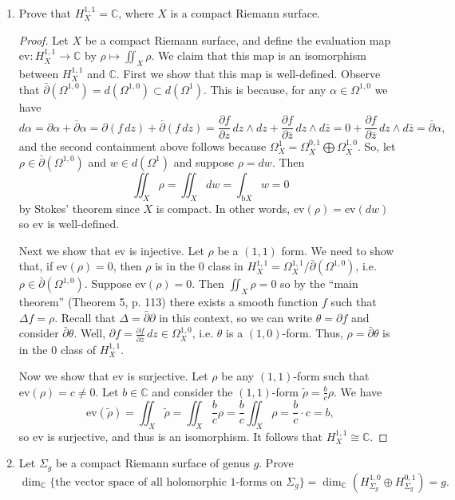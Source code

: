 \documentclass[11pt,oneside,english,reqno]{amsart}
\theoremstyle{definition}
\newcommand{\pp}[2]{\frac{\partial{#1}}{\partial{#2}}}
\newcommand{\MB}[1]{\mathbb{#1}}
\newcommand{\ev}{\text{ev}}
\begin{document}
\begin{enumerate}[leftmargin=*]
\item Prove that $H^{1,1}_X=\MB{C}$, where $X$ is a compact Riemann surface.

\begin{proof}
Let $X$ be a compact Riemann surface, and define the evaluation map $\ev:H^{1,1}_X\to\MB{C}$ by $\rho\mapsto \iint_X\rho$. We claim that this map is an isomorphism between $H^{1,1}_X$ and $\MB{C}$. First we show that this map is well-defined. Observe that $\bar\partial(\Omega^{1,0})=d(\Omega^{1,0})\subset d(\Omega^1)$. This is because, for any $\alpha\in \Omega^{1,0}$ we have
\[
d\alpha=\partial\alpha+\bar\partial\alpha=\partial(f\,dz)+\bar\partial(f\,dz)=\pp{f}{z}\,dz\wedge dz+\pp{f}{\bar z}\,dz\wedge d\bar z=0+\pp{f}{\bar z}\,dz\wedge d\bar z=\bar\partial\alpha,
\]
and the second containment above follows because $\Omega^1_X=\Omega^{0,1}_X\bigoplus\Omega^{1,0}_X$. So, let $\rho\in\bar\partial(\Omega^{1,0})$ and $w\in d(\Omega^1)$ and suppose $\rho=dw$. Then
\[
\iint_X\rho=\iint_Xdw=\int_{\text{b}X}w=0
\]
by Stokes' theorem since $X$ is compact. In other words, $\ev(\rho)=\ev(dw)$ so $\ev$ is well-defined. 

Next we show that $\ev$ is injective. Let $\rho$ be a $(1,1)$ form. We need to show that, if $\ev(\rho)=0$, then $\rho$ is in the 0 class in $H^{1,1}_X=\Omega^{1,1}_X/\bar\partial(\Omega^{1,0})$, i.e. $\rho\in\bar\partial(\Omega^{1,0})$. Suppose $\ev(\rho)=0$. Then $\iint_X\rho=0$ so by the ``main theorem'' (Theorem 5, p. 113) there exists a smooth function $f$ such that $\Delta f=\rho$. Recall that $\Delta=\bar\partial\partial$ in this context, so we can write $\theta=\partial f$ and consider $\bar\partial\theta$. Well, $\partial f=\pp{f}{z}\,dz\in\Omega^{1,0}_X$, i.e. $\theta$ is a $(1,0)$-form. Thus, $\rho=\bar\partial\theta$ is in the 0 class of $H^{1,1}_X$.

Now we show that $\ev$ is surjective. Let $\rho$ be any $(1,1)$-form such that $\ev(\rho)=c\neq0$. Let $b\in\MB{C}$ and consider the $(1,1)$-form $\tilde\rho=\frac{b}{c}\rho$. We have
\[
\ev(\tilde\rho)=\iint_X\tilde\rho=\iint_X\frac{b}{c}\rho=\frac{b}{c}\iint_X\rho=\frac{b}{c}\cdot c=b,
\]
so $\ev$ is surjective, and thus is an isomorphism. It follows that $H^{1,1}_X\cong \MB{C}$.
\end{proof}


\item Let $\Sigma_g$ be a compact Riemann surface of genus $g$. Prove 
\[
\dim_\MB{C}\{\text{the vector space of all holomorphic 1-forms on }\Sigma_g\}=\dim_\MB{C}\left(H^{1,0}_{\Sigma_g}\oplus H^{0,1}_{\Sigma_g}\right)=g.
\]


\end{enumerate}
\end{document}
